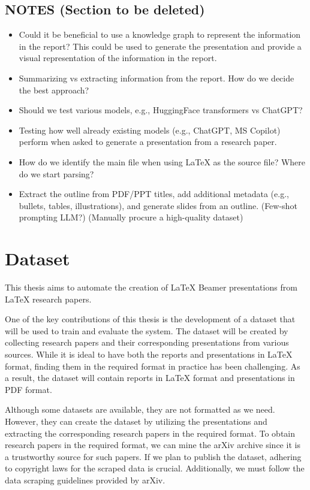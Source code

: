 %
\subsection{NOTES (Section to be deleted)}
\begin{itemize}
    \item Could it be beneficial to use a knowledge graph to represent the information in the report? This could be used to generate the presentation and provide a visual representation of the information in the report.
    \item Summarizing vs extracting information from the report. How do we decide the best approach?
    \item Should we test various models, e.g., HuggingFace transformers vs ChatGPT?
    \item Testing how well already existing models (e.g., ChatGPT, MS Copilot) perform when asked to generate a presentation from a research paper.
    \item How do we identify the main file when using LaTeX as the source file? Where do we start parsing? 
    \item Extract the outline from PDF/PPT titles, add additional metadata (e.g., bullets, tables, illustrations), and generate slides from an outline. (Few-shot prompting LLM?) (Manually procure a high-quality dataset)
\end{itemize}

\section{Dataset}
This thesis aims to automate the creation of LaTeX Beamer presentations from LaTeX research papers.

One of the key contributions of this thesis is the development of a dataset that will be used to train and evaluate the system. The dataset will be created by collecting research papers and their corresponding presentations from various sources. While it is ideal to have both the reports and presentations in LaTeX format, finding them in the required format in practice has been challenging. As a result, the dataset will contain reports in LaTeX format and presentations in PDF format.

Although some datasets are available, they are not formatted as we need. However, they can create the dataset by utilizing the presentations and extracting the corresponding research papers in the required format. To obtain research papers in the required format, we can mine the arXiv archive since it is a trustworthy source for such papers. If we plan to publish the dataset, adhering to copyright laws for the scraped data is crucial. Additionally, we must follow the data scraping guidelines provided by arXiv.

